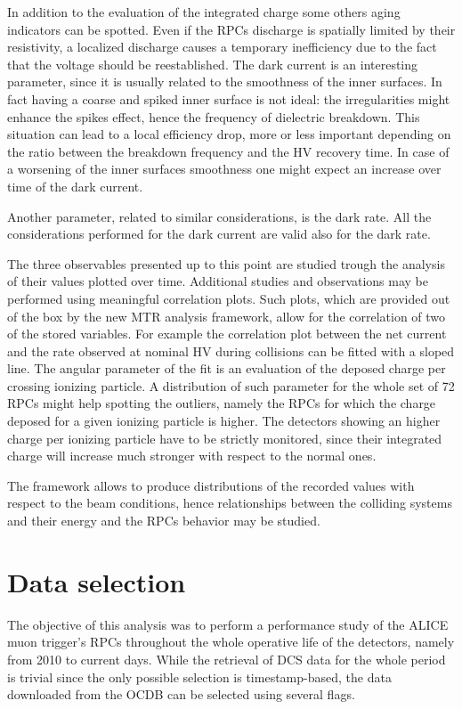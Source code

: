In addition to the evaluation of the integrated charge some others aging indicators can be spotted.
Even if the RPCs discharge is spatially limited by their resistivity, a localized discharge causes a temporary inefficiency due to the fact that the voltage should be reestablished.
The dark current is an interesting parameter, since it is usually related to the smoothness of the inner surfaces.
In fact having a coarse and spiked inner surface is not ideal: the irregularities might enhance the spikes effect, hence the frequency of dielectric breakdown.
This situation can lead to a local efficiency drop, more or less important depending on the ratio between the breakdown frequency and the HV recovery time.
In case of a worsening of the inner surfaces smoothness one might expect an increase over time of the dark current.

Another parameter, related to similar considerations, is the dark rate.
All the considerations performed for the dark current are valid also for the dark rate.

The three observables presented up to this point are studied trough the analysis of their values plotted over time.
Additional studies and observations may be performed using meaningful correlation plots.
Such plots, which are provided out of the box by the new MTR analysis framework, allow for the correlation of two of the stored variables.
For example the correlation plot between the net current and the rate observed at nominal HV during collisions can be fitted with a sloped line.
The angular parameter of the fit is an evaluation of the deposed charge per crossing ionizing particle.
A distribution of such parameter for the whole set of 72 RPCs might help spotting the outliers, namely the RPCs for which the charge deposed for a given ionizing particle is higher.
The detectors showing an higher charge per ionizing particle have to be strictly monitored, since their integrated charge will increase much stronger with respect to the normal ones.

The framework allows to produce distributions of the recorded values with respect to the beam conditions, hence relationships between the colliding systems and their energy and the RPCs behavior may be studied.

\section{Data selection}
The objective of this analysis was to perform a performance study of the ALICE muon trigger's RPCs throughout the whole operative life of the detectors, namely from 2010 to current days.
While the retrieval of DCS data for the whole period is trivial since the only possible selection is timestamp-based, the data downloaded from the OCDB can be selected using several flags.

